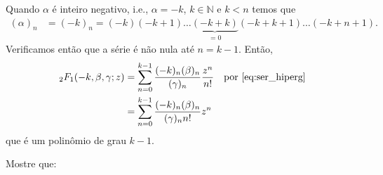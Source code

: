 \documentclass[a4paper,12pt, leqno, answers]{exam}
\begin{document}
\begin{questions}
\begin{solution}
        Quando $\alpha$ \'{e} inteiro negativo, i.e., $\alpha = -k$, $k \in \mathbb{N}$ e $k < n$ temos que
        \begin{align*}
            (\alpha)_n &= (-k)_n = (-k) (-k + 1) \ldots \underbrace{(-k + k)}_{= 0} (-k + k + 1) \ldots (-k + n + 1).
        \end{align*}
        Verificamos ent\~{a}o que a s\'{e}rie \'{e} n\~{a}o nula at\'{e} $n = k - 1$. Ent\~{a}o,
        \begin{align*}
            {}_2F_1(-k, \beta, \gamma; z) &= \sum_{n = 0}^{k - 1} \frac{(-k)_n (\beta)_n}{(\gamma)_n} \frac{z^n}{n!} && \text{por \eqref{eq:ser_hiperg}} \\
            &= \sum_{n = 0}^{k - 1} \frac{(-k)_n (\beta)_n}{(\gamma)_n n!} z^n 
        \end{align*}
        que \'{e} um polinômio de grau $k - 1$.
    \end{solution}

     Mostre que:
\end{questions}
\end{document}
